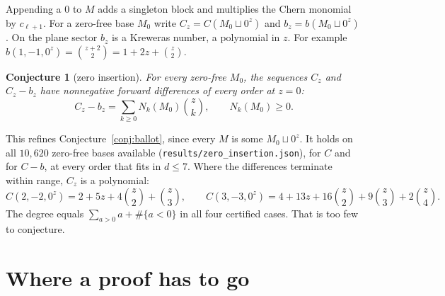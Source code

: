 \documentclass[11pt,a4paper]{article}
\theoremstyle{plain}
\newtheorem{conjecture}[theorem]{Conjecture}
\theoremstyle{definition}
\theoremstyle{remark}
\begin{document}
Appending a $0$ to $M$ adds a singleton block and multiplies the Chern monomial by $c_{\ell+1}$. For
a zero-free base $M_0$ write $C_z = C(M_0 \sqcup 0^z)$ and $b_z = b(M_0 \sqcup 0^z)$. On the plane
sector $b_z$ is a Kreweras number, a polynomial in $z$. For example $b(1,-1,0^z) = \binom{z+2}{2} = 1
+ 2z + \binom{z}{2}$.

\begin{conjecture}[zero insertion]\label{conj:zero}
For every zero-free $M_0$, the sequences $C_z$ and $C_z - b_z$ have nonnegative forward differences
of every order at $z = 0$:
\[
  C_z - b_z = \sum_{k \ge 0} N_k(M_0) \binom{z}{k}, \qquad N_k(M_0) \ge 0 .
\]
\end{conjecture}

This refines Conjecture~\ref{conj:ballot}, since every $M$ is some $M_0 \sqcup 0^z$. It holds on
all $10{,}620$ zero-free bases available (\texttt{results/zero\_insertion.json}), for $C$ and for
$C - b$, at every order that fits in $d \le 7$. Where the differences terminate within range,
$C_z$ is a polynomial:
\[
  C(2,-2,0^z) = 2 + 5z + 4\binom z2 + \binom z3, \qquad
  C(3,-3,0^z) = 4 + 13 z + 16\binom z2 + 9\binom z3 + 2\binom z4 .
\]
The degree equals $\sum_{a > 0} a + \#\{a < 0\}$ in all four certified cases. That is too few to
conjecture.

\section{Where a proof has to go}
\end{document}
